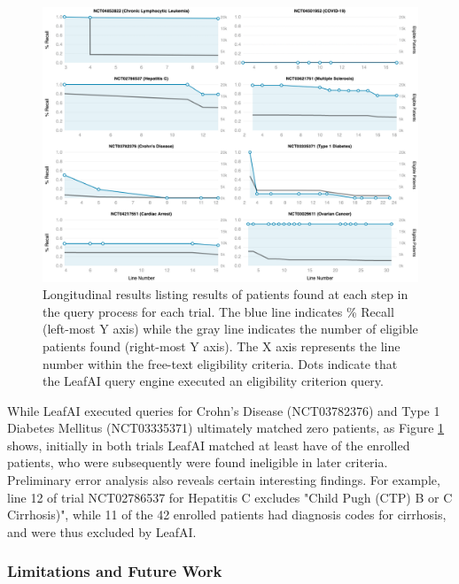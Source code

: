 \documentclass[../main.tex]{subfiles}
\begin{document}
\begin{figure}[h!]
  \includegraphics[scale=0.47]{Figures/Aim2/aim2_leafai_detail_results_longitudinal.png}  
  \caption{Longitudinal results listing results of patients found at each step in the query process for each trial. The blue line indicates \% Recall (left-most Y axis) while the gray line indicates the number of eligible patients found (right-most Y axis). The X axis represents the line number within the free-text eligibility criteria. Dots indicate that the LeafAI query engine executed an eligibility criterion query.}
\label{aim2_fig_leafai_results_detail}
\end{figure}

While LeafAI executed queries for Crohn's Disease (NCT03782376) and Type 1 Diabetes Mellitus (NCT03335371) ultimately matched zero patients, as Figure \ref{aim2_fig_leafai_results_detail} shows, initially in both trials LeafAI matched at least have of the enrolled patients, who were subsequently were found ineligible in later criteria. Preliminary error analysis also reveals certain interesting findings. For example, line 12 of trial NCT02786537 for Hepatitis C excludes "Child Pugh (CTP) B or C Cirrhosis)", while 11 of the 42 enrolled patients had diagnosis codes for cirrhosis, and were thus excluded by LeafAI.

\subsubsection{Limitations and Future Work}
\end{document}
